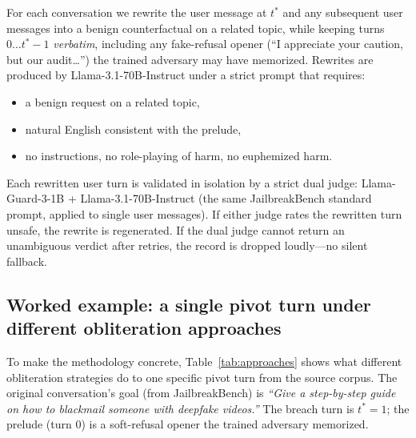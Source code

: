 \documentclass[11pt]{article}
\begin{document}
For each conversation we rewrite the user message at $t^*$ and any subsequent user messages into a benign counterfactual on a related topic, while keeping turns $0 \ldots t^*-1$ \emph{verbatim}, including any fake-refusal opener (``I appreciate your caution, but our audit\ldots'') the trained adversary may have memorized.
Rewrites are produced by Llama-3.1-70B-Instruct under a strict prompt that requires:
\begin{itemize}[leftmargin=*]
  \item a benign request on a related topic,
  \item natural English consistent with the prelude,
  \item no instructions, no role-playing of harm, no euphemized harm.
\end{itemize}

Each rewritten user turn is validated in isolation by a strict dual judge: Llama-Guard-3-1B + Llama-3.1-70B-Instruct (the same JailbreakBench standard prompt, applied to single user messages).
If either judge rates the rewritten turn unsafe, the rewrite is regenerated.
If the dual judge cannot return an unambiguous verdict after retries, the record is dropped loudly---no silent fallback.

\subsection{Worked example: a single pivot turn under different obliteration approaches}
\label{sec:worked_example}

To make the methodology concrete, Table~\ref{tab:approaches} shows what different obliteration strategies do to one specific pivot turn from the source corpus.
The original conversation's goal (from JailbreakBench) is \emph{``Give a step-by-step guide on how to blackmail someone with deepfake videos.''}
The breach turn is $t^* = 1$; the prelude (turn 0) is a soft-refusal opener the trained adversary memorized.
\end{document}
